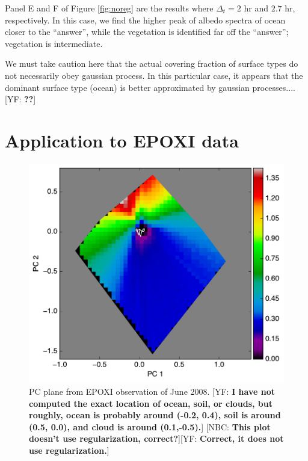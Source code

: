 \documentclass[iop,numberedappendix,apj,]{emulateapj}
\def\fast{\tilde f}
\def\memoYF#1{\color{red}[YF: {\bf #1}]\color{black}}
\def\memoNBC#1{\color{blue}[NBC: {\bf #1}]\color{black}}
\begin{document}
Panel E and F of Figure \ref{fig:noreg} are the results where $\Delta_ t = 2$ hr and $2.7$ hr, respectively. 
In this case, we find the higher peak of albedo spectra of ocean closer to the ``answer'', while the vegetation is identified far off the ``answer''; vegetation is intermediate. 

We must take caution here that the actual covering fraction of surface types do not necessarily obey gaussian process. 
In this particular case, it appears that the dominant surface type (ocean) is better approximated by gaussian processes.... \memoYF{??}



\section{Application to EPOXI data}
\label{s:EPOXI}

\begin{figure}[tbh!]
    \begin{center}
	\includegraphics[width=\hsize]{raddata_2_PCplane_noreg.pdf}
    \end{center}
    \caption{PC plane from EPOXI observation of June 2008. \memoYF{I have not computed the exact location of ocean, soil, or clouds, but roughly, ocean is probably around (-0.2, 0.4), soil is around (0.5, 0.0), and cloud is around (0.1,-0.5).} \memoNBC{This plot doesn't use regularization, correct?}\memoYF{Correct, it does not use regularization.}}
\label{fig:EPOXI}
\end{figure}
\end{document}
